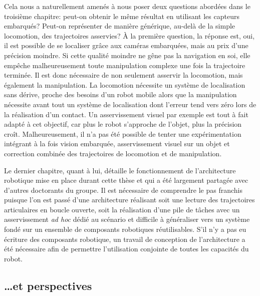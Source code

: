 Cela nous a naturellement amenés à nous poser deux questions abordées
dans le troisième chapitre: peut-on obtenir le même résultat en
utilisant les capteurs embarqués? Peut-on représenter de manière
générique, au-delà de la simple locomotion, des trajectoires
asservies? À la première question, la réponse est, oui, il est
possible de se localiser grâce aux caméras embarquées, mais au prix
d'une précision moindre. Si cette qualité moindre ne gêne pas la
navigation en soi, elle empêche malheureusement toute manipulation
complexe une fois la trajectoire terminée. Il est donc nécessaire de
non seulement asservir la locomotion, mais également la manipulation. La
locomotion nécessite un système de localisation sans dérive, proche
des besoins d'un robot mobile alors que la manipulation nécessite avant
tout un système de localisation dont l'erreur tend vers zéro lors de
la réalisation d'un contact. Un asservissement visuel par exemple est
tout à fait adapté à cet objectif, car plus le robot s'approche de
l'objet, plus la précision croît. Malheureusement, il n'a pas été
possible de tenter une expérimentation intégrant à la fois vision
embarquée, asservissement visuel sur un objet et correction combinée
des trajectoires de locomotion et de manipulation.


Le dernier chapitre, quant à lui, détaille le fonctionnement de
l'architecture robotique mise en place durant cette thèse et qui a été
largement partagée avec d'autres doctorants du groupe. Il est
nécessaire de comprendre le pas franchis puisque l'on est passé d'une
architecture réalisant soit une lecture des trajectoires articulaires
en boucle ouverte, soit la réalisation d'une pile de tâches avec un
asservissement \emph{ad hoc} dédié au scénario et difficile à
généraliser vers un système fondé sur un ensemble de composants
robotiques réutilisables. S'il n'y a pas eu écriture des composants
robotique, un travail de conception de l'architecture a été nécessaire
afin de permettre l'utilisation conjointe de toutes les capacités du
robot.



\subsection{\ldots et perspectives}


